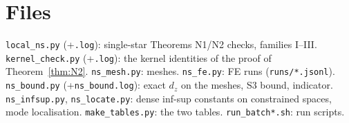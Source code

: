 \documentclass[11pt]{article}
\theoremstyle{remark}
\begin{document}
\section*{Files}
\texttt{local\_ns.py} (+\texttt{.log}): single-star Theorems N1/N2 checks, families I--III. \texttt{kernel\_check.py} (+\texttt{.log}): the
kernel identities of the proof of Theorem~\ref{thm:N2}. \texttt{ns\_mesh.py}: meshes. \texttt{ns\_fe.py}: FE runs (\texttt{runs/*.jsonl}).
\texttt{ns\_bound.py} (+\texttt{ns\_bound.log}): exact $d_z$ on the meshes, S3 bound, indicator. \texttt{ns\_infsup.py}, \texttt{ns\_locate.py}:
dense inf-sup constants on constrained spaces, mode localisation. \texttt{make\_tables.py}: the two tables.
\texttt{run\_batch*.sh}: run scripts.
\end{document}
